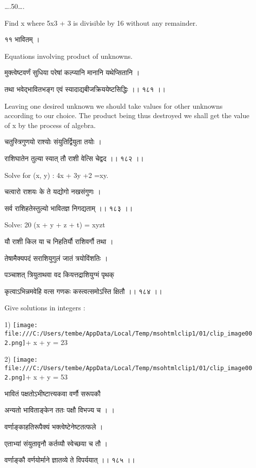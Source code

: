 \documentclass[]{article}
\date{}
\begin{document}
{\ldots{}.50\ldots{}.}

{Find x where 5x3 + 3 is divisible by 16 without any remainder.}

{११ भावितम् । }

{Equations involving product of unknowns.}

{मुक्त्वेष्टवर्णं सुधिया परेषां कल्प्यानि मानानि यथेप्सितानि । }

{तथा भवेद्भावितभङ्ग एवं स्यादाद्यबीजक्रिययेष्टसिद्धिः ।। १८१ ।। }

{Leaving one desired unknown we should take values for other unknowns
according to our choice. The product being thus destroyed we shall get
the value of x by the process of algebra.}

{चतुस्त्रिगुणयो राश्योः संयुतिर्द्वियुता तयोः । }

{राशिघातेन तुल्या स्यात् तौ राशी वेत्सि चेद्वद ।। १८२ ।। }

{Solve for (x, y) : 4x + 3y +2 =xy.}

{चत्वारो राशयः के ते यद्योगो नखसंगुणः । }

{सर्व राशिहतेस्तुल्यो भावितज्ञ निगद्यताम् ।। १८३ ।। }

{Solve: 20 (x + y + z + t) = xyzt}

{यौ राशी किल या च निहतिर्यौ राशिवर्गौ तथा । }

{तेषामैक्यपदं सराशियुगुलं जातं त्रयोविंशतिः । }

{पञ्चाशत् त्रियुताथवा वद कियत्तद्राशियुग्मं पृथक् }

{कृत्वाऽभिन्नमवेहि वत्स गणकः कस्त्वत्समोऽस्ति क्षितौ ।। १८४ ।। }

{Give solutions in integers :}

{1)
}\texttt{[image: file:///C:/Users/tembe/AppData/Local/Temp/msohtmlclip1/01/clip\_image002.png]}{+
x + y = 23}

{2)
}\texttt{[image: file:///C:/Users/tembe/AppData/Local/Temp/msohtmlclip1/01/clip\_image002.png]}{+
x + y = 53}

{भावितं पक्षतोऽभीष्टात्त्यकवा वर्णौ सरूपकौ }

{अन्यतो भाविताङ्केन ततः पक्षौ विभज्य च । । }

{वर्णाङ्काहतिरूपैक्यं भक्त्वेष्टेनेष्टतत्फले । }

{एताभ्यां संयुतावृनौ कर्तव्यौ स्वेच्छया च तौ । }

{वर्णाङ्कौ वर्णयोर्माने ज्ञातव्ये ते विपर्ययात् ।। १८५ ।।}{\\
}
\end{document}
